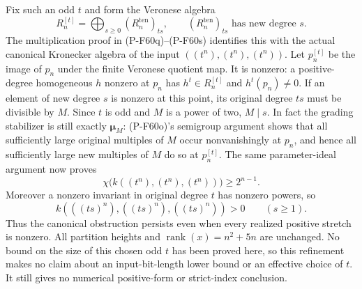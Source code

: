 Fix such an odd $t$ and form the Veronese algebra
\[
       R^{[t]}_n=\bigoplus_{s\ge0}(R^{\mathrm{ten}}_n)_{ts},
       \qquad (R^{\mathrm{ten}}_n)_{ts}
                    \text{ has new degree }s.
                                                        \tag{P-F60w}
\]
The multiplication proof in (P-F60q)--(P-F60s) identifies
this with the actual canonical Kronecker algebra of
the input $((t^n),(t^n),(t^n))$.
Let $p_n^{[t]}$ be the image of $p_n$ under the finite
Veronese quotient map.  It is nonzero: a positive-degree
homogeneous $h$ nonzero at $p_n$ has $h^t\in R^{[t]}_n$
and $h^t(p_n)\ne0$.
If an element of new degree $s$ is nonzero at this point,
its original degree $ts$ must be divisible by $M$.
Since $t$ is odd and $M$ is a power of two, $M\mid s$.
In fact the grading stabilizer is still exactly
$\boldsymbol\mu_M$: (P-F60o)'s semigroup argument shows
that all sufficiently large original multiples of $M$
occur nonvanishingly at $p_n$, and hence all sufficiently
large new multiples of $M$ do so at $p_n^{[t]}$.
The same parameter-ideal argument now proves
\[
      \chi\bigl(k((t^n),(t^n),(t^n))\bigr)\ge2^{n-1}.
                                                        \tag{P-F60x}
\]
Moreover a nonzero invariant in original degree $t$
has nonzero powers, so
\[
 k(((ts)^n),((ts)^n),((ts)^n))>0\qquad(s\ge1).
\]
Thus the canonical obstruction persists even when every
realized positive stretch is nonzero.  All partition
heights and $\operatorname{rank}(x)=n^2+5n$ are unchanged.
No bound on the size of this chosen odd $t$ has been
proved here, so this refinement makes no claim about
an input-bit-length lower bound or an effective choice
of $t$.  It still gives no numerical positive-form or
strict-index conclusion.
